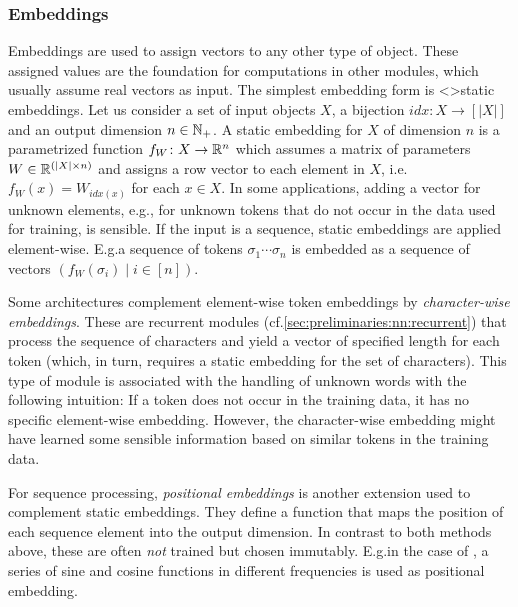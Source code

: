 \documentclass[../document.tex]{subfiles}
\begin{document}
    \subsubsection{Embeddings}
    Embeddings are used to assign vectors to any other type of object.
    These assigned values are the foundation for computations in other modules, which usually assume real vectors as input.
    The simplest embedding form is <>{static embeddings}.
    Let us consider a set of input objects \(X\), a bijection \(\mathit{idx}\colon X \to [|X|]\) and an output dimension \(n \in \mathbb{N}_+\).
    A static embedding for \(X\) of dimension \(n\) is a parametrized function \(f_W\colon X \to \mathbb{R}^n\) which assumes a matrix of parameters \(W \in \mathbb{R}^{(|X| \times n)}\) and assigns a row vector to each element in \(X\), i.e.\@ \(f_W(x) = W_{\mathit{idx}(x)}\) for each \(x \in X\).
    In some applications, adding a vector for unknown elements, e.g.\@, for unknown tokens that do not occur in the data used for training, is sensible.
    If the input is a sequence, static embeddings are applied element-wise.
    E.g.\@ a sequence of tokens \(\sigma_1 \cdots \sigma_n\) is embedded as a sequence of vectors \((f_W(\sigma_i) \mid i \in [n])\).

    Some architectures complement element-wise token embeddings by \emph{character-wise embeddings}. \citep{}
    These are recurrent modules (cf.\@ \cref{sec:preliminaries:nn:recurrent}) that process the sequence of characters and yield a vector of specified length for each token (which, in turn, requires a static embedding for the set of characters).
    This type of module is associated with the handling of unknown words with the following intuition:
        If a token does not occur in the training data, it has no specific element-wise embedding.
        However, the character-wise embedding might have learned some sensible information based on similar tokens in the training data.

    For sequence processing, \emph{positional embeddings} is another extension used to complement static embeddings.
    They define a function that maps the position of each sequence element into the output dimension.
    In contrast to both methods above, these are often \emph{not} trained but chosen immutably.
    E.g.\@ in the case of , a series of sine and cosine functions in different frequencies is used as positional embedding.

\end{document}
